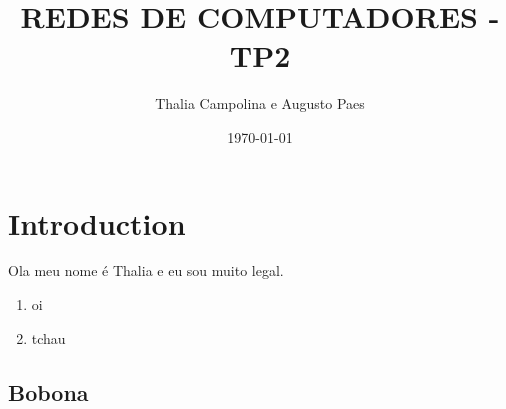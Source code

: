 \documentclass[twocolums]{article}
\title{REDES DE COMPUTADORES - TP2}
\author{Thalia Campolina e Augusto Paes}
\date{\today}
\begin{document}
\maketitle
\pagebreak
\section{Introduction}
Ola meu nome é Thalia e eu sou muito legal.

\begin{enumerate}
 \item oi
\item tchau

\end{enumerate}


\subsection{Bobona}
\end{document}
